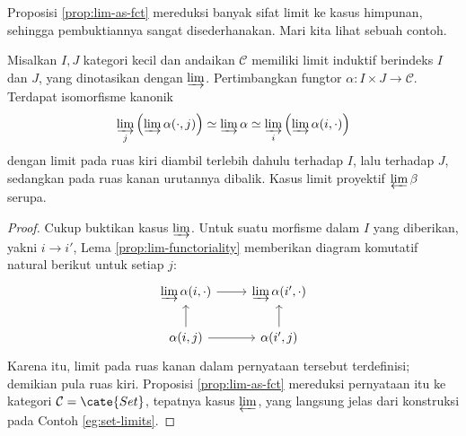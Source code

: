 Proposisi \ref{prop:lim-as-fct} mereduksi banyak sifat limit ke kasus himpunan, sehingga pembuktiannya sangat disederhanakan. Mari kita lihat sebuah contoh.
\begin{lemma}\label{prop:lim-Fubini}
	Misalkan $I, J$ kategori kecil dan andaikan $\mathcal{C}$ memiliki limit induktif berindeks $I$ dan $J$, yang dinotasikan dengan $\varinjlim$. Pertimbangkan fungtor $\alpha: I \times J \to \mathcal{C}$. Terdapat isomorfisme kanonik
	\[ \varinjlim_j \left( \varinjlim\alpha(\cdot, j) \right) \simeq \varinjlim \alpha \simeq \varinjlim_i \left( \varinjlim\alpha(i, \cdot) \right) \]
	dengan limit pada ruas kiri diambil terlebih dahulu terhadap $I$, lalu terhadap $J$, sedangkan pada ruas kanan urutannya dibalik. Kasus limit proyektif $\varprojlim \beta$ serupa.
\end{lemma}
\begin{proof}
	Cukup buktikan kasus $\varinjlim$. Untuk suatu morfisme dalam $I$ yang diberikan, yakni $i \to i'$, Lema \ref{prop:lim-functoriality} memberikan diagram komutatif natural berikut untuk setiap $j$:
	\[ \begin{tikzcd}
		\varinjlim \alpha(i, \cdot) \arrow[r] & \varinjlim \alpha(i', \cdot) \\
		\alpha(i, j) \arrow[r] \arrow[u] & \alpha(i', j) \arrow[u]
	\end{tikzcd} \]
	Karena itu, limit pada ruas kanan dalam pernyataan tersebut terdefinisi; demikian pula ruas kiri. Proposisi \ref{prop:lim-as-fct} mereduksi pernyataan itu ke kategori $\mathcal{C} = \cate{Set}$, tepatnya kasus $\varprojlim$, yang langsung jelas dari konstruksi pada Contoh \ref{eg:set-limits}.
\end{proof}

